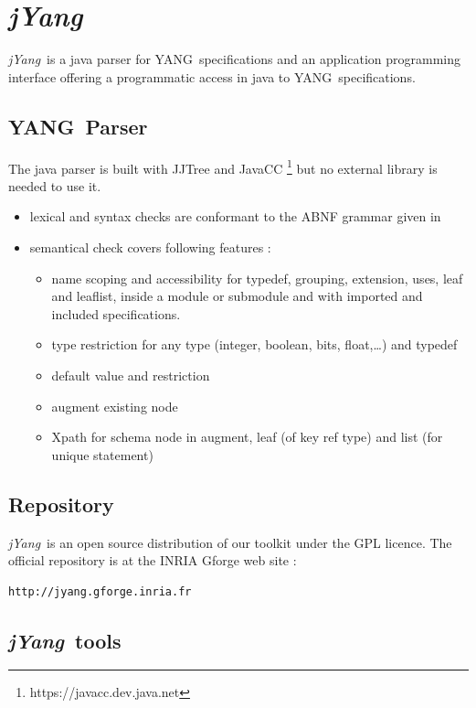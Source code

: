 \documentclass[a4paper]{article}
\begin{document}
\section{{\sl jYang\/}}

{\sl  jYang\/}\ is  a  java  parser for  YANG\  specifications and  an
application  programming interface offering  a programmatic  access in
java to YANG\ specifications.

\subsection{YANG\ Parser}

The    java    parser    is    built   with    JJTree    and    JavaCC
\footnote{https://javacc.dev.java.net}  but  no  external  library  is
needed to use it.

\begin{itemize}
\item
lexical and syntax  checks are conformant to the  ABNF grammar given in
\cite{yang01}
\item
semantical check covers following features :
\begin{itemize}
\item
name scoping and accessibility for typedef, grouping, extension, uses,
leaf and  leaflist, inside  a module  or submodule  and with  imported and
included specifications.
\item
type restriction  for any type (integer,  boolean, bits, float,\ldots)
and typedef
\item
default value and restriction
\item
augment existing node
\item
Xpath for schema node in augment, leaf (of key ref type) and list (for
unique statement)
\end{itemize}
\end{itemize}

\subsection{Repository}

{\sl jYang\/}\ is  an open source distribution  of our toolkit  under the GPL
licence. The official repository is at the INRIA Gforge web site :\\
\begin{verbatim}
http://jyang.gforge.inria.fr
\end{verbatim}

\subsection{{\sl jYang\/}\ tools}
\end{document}
